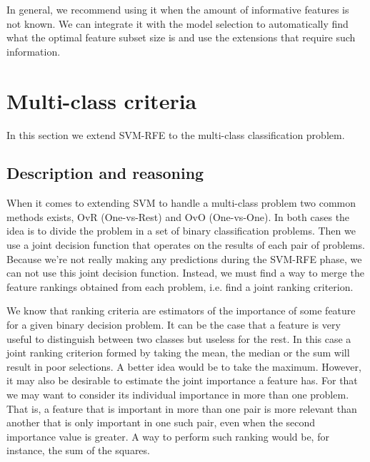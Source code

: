 In general, we recommend using it when the amount of informative features is not known. We can integrate it with the model selection to automatically find what the optimal feature subset size is and use the extensions that require such information.



\section{Multi-class criteria}

In this section we extend SVM-RFE to the multi-class classification problem.

\subsection{Description and reasoning}
\label{sec:stopCond.desc}

When it comes to extending SVM to handle a multi-class problem two common methods exists, OvR (One-vs-Rest) and OvO (One-vs-One). In both cases the idea is to divide the problem in a set of binary classification problems. Then we use a joint decision function that operates on the results of each pair of problems. Because we're not really making any predictions during the SVM-RFE phase, we can not use this joint decision function. Instead, we must find a way to merge the feature rankings obtained from each problem, i.e. find a joint ranking criterion.

We know that ranking criteria are estimators of the importance of some feature for a given binary decision problem. It can be the case that a feature is very useful to distinguish between two classes but useless for the rest. In this case a joint ranking criterion formed by taking the mean, the median or the sum will result in poor selections. A better idea would be to take the maximum. However, it may also be desirable to estimate the joint importance a feature has. For that we may want to consider its individual importance in more than one problem. That is, a feature that is important in more than one pair is more relevant than another that is only important in one such pair, even when the second importance value is greater. A way to perform such ranking would be, for instance, the sum of the squares.

